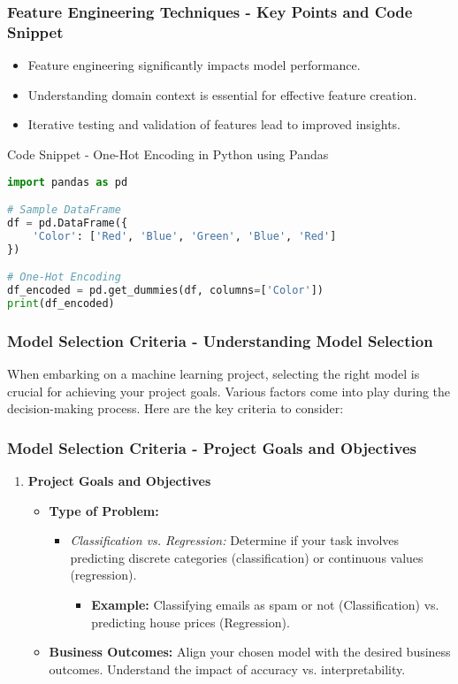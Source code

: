 \documentclass[aspectratio=169]{beamer}
\begin{document}
\begin{frame}[fragile]
    \frametitle{Feature Engineering Techniques - Key Points and Code Snippet}
    \begin{itemize}
        \item Feature engineering significantly impacts model performance.
        \item Understanding domain context is essential for effective feature creation.
        \item Iterative testing and validation of features lead to improved insights.
    \end{itemize}
    \begin{block}{Code Snippet - One-Hot Encoding in Python using Pandas}
        \begin{lstlisting}[language=Python]
import pandas as pd

# Sample DataFrame
df = pd.DataFrame({
    'Color': ['Red', 'Blue', 'Green', 'Blue', 'Red']
})

# One-Hot Encoding
df_encoded = pd.get_dummies(df, columns=['Color'])
print(df_encoded)
        \end{lstlisting}
    \end{block}
\end{frame}

\begin{frame}[fragile]
    \frametitle{Model Selection Criteria - Understanding Model Selection}
    When embarking on a machine learning project, selecting the right model is crucial for achieving your project goals. Various factors come into play during the decision-making process. Here are the key criteria to consider:
\end{frame}

\begin{frame}[fragile]
    \frametitle{Model Selection Criteria - Project Goals and Objectives}
    \begin{enumerate}
        \item \textbf{Project Goals and Objectives}
        \begin{itemize}
            \item \textbf{Type of Problem:}
            \begin{itemize}
                \item \textit{Classification vs. Regression:} Determine if your task involves predicting discrete categories (classification) or continuous values (regression).
                \begin{itemize}
                    \item \textbf{Example:} Classifying emails as spam or not (Classification) vs. predicting house prices (Regression).
                \end{itemize}
            \end{itemize}
            \item \textbf{Business Outcomes:} Align your chosen model with the desired business outcomes. Understand the impact of accuracy vs. interpretability.
        \end{itemize}
    \end{enumerate}
\end{frame}
\end{document}
